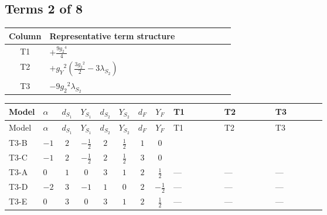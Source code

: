 \documentclass[8pt]{article}
\begin{document}
\begin{landscape}
\subsection*{Terms 2 of 8}
\begin{center}
\begin{tabular}{@{}c >{\raggedright\arraybackslash}p{0.82\linewidth}@{}}
\toprule
Column & Representative term structure \\
\midrule
T1 & \(\displaystyle +\frac{9 {g_2}^4}{4}\) \\
\midrule
T2 & \(\displaystyle +{g_Y}^2 \left(\frac{3 {g_2}^2}{2}-3 {\lambda_{S_2}}\right)\) \\
\midrule
T3 & \(\displaystyle -9 {g_2}^2 {\lambda_{S_2}}\) \\
\midrule
\bottomrule
\end{tabular}
\end{center}
\smallskip
\tiny
\begin{longtable}{@{}llcccccc >{\raggedright\arraybackslash}p{0.21\linewidth} >{\raggedright\arraybackslash}p{0.21\linewidth} >{\raggedright\arraybackslash}p{0.21\linewidth}@{}}
\toprule
Model & $\alpha$ & $d_{S_1}$ & $Y_{S_1}$ & $d_{S_2}$ & $Y_{S_2}$ & $d_F$ & $Y_F$ & T1 & T2 & T3 \\
\midrule
\endfirsthead
\toprule
Model & $\alpha$ & $d_{S_1}$ & $Y_{S_1}$ & $d_{S_2}$ & $Y_{S_2}$ & $d_F$ & $Y_F$ & T1 & T2 & T3 \\
\midrule
\endhead
T3-B & $-1$ & $2$ & $-\frac{1}{2}$ & $2$ & $\frac{1}{2}$ & $1$ & $0$ & \scriptsize\adjustbox{max width=\linewidth}{$\begin{gathered} +\frac{9 {g_2}^4}{4}\end{gathered}$} & \scriptsize\adjustbox{max width=\linewidth}{$\begin{gathered} +{g_Y}^2 \left(\frac{3 {g_2}^2}{2}-3 {\lambda_{S_2}}\right)\end{gathered}$} & \scriptsize\adjustbox{max width=\linewidth}{$\begin{gathered} -9 {g_2}^2 {\lambda_{S_2}}\end{gathered}$} \\
\midrule
T3-C & $-1$ & $2$ & $-\frac{1}{2}$ & $2$ & $\frac{1}{2}$ & $3$ & $0$ & \scriptsize\adjustbox{max width=\linewidth}{$\begin{gathered} +\frac{9 {g_2}^4}{4}\end{gathered}$} & \scriptsize\adjustbox{max width=\linewidth}{$\begin{gathered} +{g_Y}^2 \left(\frac{3 {g_2}^2}{2}-3 {\lambda_{S_2}}\right)\end{gathered}$} & \scriptsize\adjustbox{max width=\linewidth}{$\begin{gathered} -9 {g_2}^2 {\lambda_{S_2}}\end{gathered}$} \\
\midrule
T3-A & $0$ & $1$ & $0$ & $3$ & $1$ & $2$ & $\frac{1}{2}$ & --- & --- & --- \\
\midrule
T3-D & $-2$ & $3$ & $-1$ & $1$ & $0$ & $2$ & $-\frac{1}{2}$ & --- & --- & --- \\
\midrule
T3-E & $0$ & $3$ & $0$ & $3$ & $1$ & $2$ & $\frac{1}{2}$ & --- & --- & --- \\
\midrule
\bottomrule
\end{longtable}
\clearpage

\end{landscape}
\end{document}
